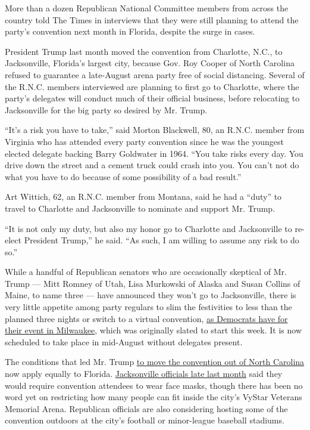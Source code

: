 More than a dozen Republican National Committee members from across the
country told The Times in interviews that they were still planning to
attend the party's convention next month in Florida, despite the surge
in cases.

President Trump last month moved the convention from Charlotte, N.C., to
Jacksonville, Florida's largest city, because Gov. Roy Cooper of North
Carolina refused to guarantee a late-August arena party free of social
distancing. Several of the R.N.C. members interviewed are planning to
first go to Charlotte, where the party's delegates will conduct much of
their official business, before relocating to Jacksonville for the big
party so desired by Mr. Trump.

``It's a risk you have to take,'' said Morton Blackwell, 80, an R.N.C.
member from Virginia who has attended every party convention since he
was the youngest elected delegate backing Barry Goldwater in 1964. ``You
take risks every day. You drive down the street and a cement truck could
crash into you. You can't not do what you have to do because of some
possibility of a bad result.''

Art Wittich, 62, an R.N.C. member from Montana, said he had a ``duty''
to travel to Charlotte and Jacksonville to nominate and support Mr.
Trump.

``It is not only my duty, but also my honor go to Charlotte and
Jacksonville to re-elect President Trump,'' he said. ``As such, I am
willing to assume any risk to do so.''

While a handful of Republican senators who are occasionally skeptical of
Mr. Trump --- Mitt Romney of Utah, Lisa Murkowski of Alaska and Susan
Collins of Maine, to name three --- have announced they won't go to
Jacksonville, there is very little appetite among party regulars to slim
the festivities to less than the planned three nights or switch to a
virtual convention,
\href{https://www.nytimes.com/2020/06/24/us/politics/democratic-convention-milwaukee-coronavirus.html}{as
Democrats have for their event in Milwaukee}, which was originally
slated to start this week. It is now scheduled to take place in
mid-August without delegates present.

The conditions that led Mr. Trump
\href{https://www.nytimes.com/2020/06/11/us/politics/trump-jacksonville-rnc-speech.html}{to
move the convention out of North Carolina} now apply equally to Florida.
\href{https://www.nytimes.com/2020/06/29/us/politics/rnc-masks-convention.html}{Jacksonville
officials late last month} said they would require convention attendees
to wear face masks, though there has been no word yet on restricting how
many people can fit inside the city's VyStar Veterans Memorial Arena.
Republican officials are also considering hosting some of the convention
outdoors at the city's football or minor-league baseball stadiums.

